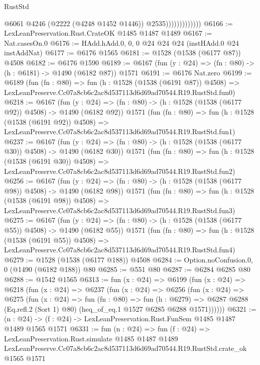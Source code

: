 \begin{lexlean}{RustStd}
\begin{coremodule}
                              @6061
                              @4246
                              (@2222 (@4248 @1452 @1446))
                              @2535)))))))))))))
@6166 := LexLeanPreservation.Rust.CrateOK @1485 @1487 @1489
@6167 := Nat.casesOn.{0}
@6176 := HAdd.hAdd.{0, 0, 0} @24 @24 @24 (instHAdd.{0} @24 instAddNat)
@6177 := @6176 @1565
@6181 := @1528 (@1538 (@6177 @87)) @4508
@6182 := @6176 @1590
@6189 := @6167 (fun (y : @24) => (fn : @80) -> (h : @6181) -> @1490 (@6182 @87)) @1571
@6191 := @6176 Nat.zero
@6199 := @6189
    (fun (fn : @80) =>
    fun (h : @1528 (@1538 (@6191 @87)) @4508) =>
    LexLeanPreserve.Cc07a8cb6c2ac8d537113d6d69ad70544.R19.RustStd.fun0)
@6218 := @6167
    (fun (y : @24) => (fn : @80) -> (h : @1528 (@1538 (@6177 @92)) @4508) -> @1490 (@6182 @92))
    @1571
    (fun (fn : @80) =>
    fun (h : @1528 (@1538 (@6191 @92)) @4508) =>
    LexLeanPreserve.Cc07a8cb6c2ac8d537113d6d69ad70544.R19.RustStd.fun1)
@6237 := @6167
    (fun (y : @24) => (fn : @80) -> (h : @1528 (@1538 (@6177 @30)) @4508) -> @1490 (@6182 @30))
    @1571
    (fun (fn : @80) =>
    fun (h : @1528 (@1538 (@6191 @30)) @4508) =>
    LexLeanPreserve.Cc07a8cb6c2ac8d537113d6d69ad70544.R19.RustStd.fun2)
@6256 := @6167
    (fun (y : @24) => (fn : @80) -> (h : @1528 (@1538 (@6177 @98)) @4508) -> @1490 (@6182 @98))
    @1571
    (fun (fn : @80) =>
    fun (h : @1528 (@1538 (@6191 @98)) @4508) =>
    LexLeanPreserve.Cc07a8cb6c2ac8d537113d6d69ad70544.R19.RustStd.fun3)
@6275 := @6167
    (fun (y : @24) => (fn : @80) -> (h : @1528 (@1538 (@6177 @55)) @4508) -> @1490 (@6182 @55))
    @1571
    (fun (fn : @80) =>
    fun (h : @1528 (@1538 (@6191 @55)) @4508) =>
    LexLeanPreserve.Cc07a8cb6c2ac8d537113d6d69ad70544.R19.RustStd.fun4)
@6279 := @1528 (@1538 (@6177 @188)) @4508
@6284 := Option.noConfusion.{0, 0} (@1490 (@6182 @188)) @80
@6285 := @551 @80
@6287 := @6284 @6285 @80
@6288 := @1542 @1565
@6313 := fun (x : @24) =>
  @6199
    (fun (x : @24) =>
    @6218
      (fun (x : @24) =>
      @6237
        (fun (x : @24) =>
        @6256
          (fun (x : @24) =>
          @6275
            (fun (x : @24) =>
            fun (fn : @80) =>
            fun (h : @6279) =>
            @6287 @6288 (Eq.refl.{2} (Sort 1) @80) (heq_of_eq.{1} @1527 @6285 @6288 @1571))))))
@6321 := (n : @24) -> (f : @24) -> LexLeanPreservation.Rust.FunSem @1485 @1487 @1489 @1565 @1571
@6331 := fun (n : @24) =>
  fun (f : @24) =>
  LexLeanPreservation.Rust.simulate
    @1485
    @1487
    @1489
    LexLeanPreserve.Cc07a8cb6c2ac8d537113d6d69ad70544.R19.RustStd.crate_ok
    @1565
    @1571
\end{coremodule}
\end{lexlean}
